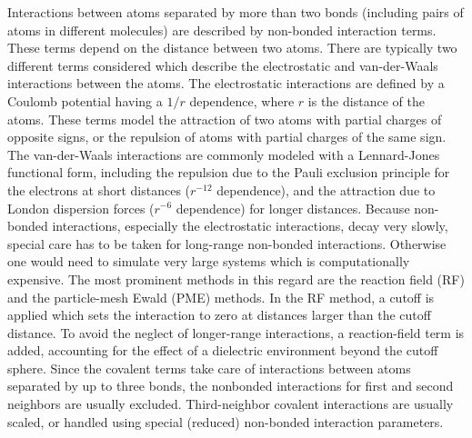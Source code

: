 Interactions between atoms separated by more than two bonds (including pairs
of atoms in different molecules) are described by non-bonded interaction terms.
These terms depend on the distance between two atoms.
%
There are typically two different terms considered which describe the
electrostatic and van-der-Waals interactions between the atoms.
%
The electrostatic interactions are defined by a Coulomb potential 
having a  $1/r$ dependence, where $r$ is the distance of the atoms.
These terms model the attraction of two atoms with partial charges of opposite signs,
or the repulsion of atoms with partial charges of the same sign.
%
The van-der-Waals interactions are commonly modeled with a Lennard-Jones functional form,
including the repulsion due to the Pauli exclusion principle for the
electrons at short distances ($r^{-12}$ dependence), and the attraction
due to London dispersion forces ($r^{-6}$ dependence) for longer distances.
Because non-bonded interactions, especially the electrostatic interactions,
decay very slowly, special care has to be taken for long-range non-bonded 
interactions. Otherwise one would need to simulate very large systems
which is computationally expensive.
%
The most prominent methods in this regard are the
reaction field\cite{BE86.3} (RF) and the particle-mesh Ewald\cite{DA93.1} (PME) methods.
%
In the RF method, a cutoff is applied which sets the interaction 
to zero at distances larger than the cutoff distance. 
%
To avoid the neglect of longer-range interactions, a reaction-field term 
is added, accounting for the effect of a
dielectric environment beyond the cutoff sphere.
%
%
Since the covalent terms take care of interactions between atoms
separated by up to three bonds, the nonbonded interactions for
first and second neighbors are usually excluded.
Third-neighbor covalent interactions are usually scaled, or
handled using special (reduced) non-bonded interaction parameters.
